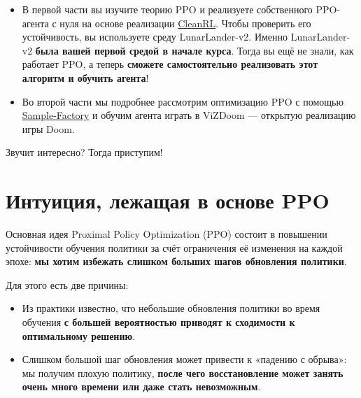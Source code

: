 \documentclass[11pt,a4paper]{article}
\begin{document}
\begin{itemize}
\tightlist
\item
  В первой части вы изучите теорию PPO и реализуете собственного PPO-агента с нуля на основе реализации \href{https://github.com/vwxyzjn/cleanrl}{CleanRL}. Чтобы проверить его устойчивость, вы используете среду LunarLander-v2. Именно LunarLander-v2 \textbf{была вашей первой средой в начале курса}. Тогда вы ещё не знали, как работает PPO, а теперь \textbf{сможете самостоятельно реализовать этот алгоритм и обучить агента}!
\item
  Во второй части мы подробнее рассмотрим оптимизацию PPO с помощью \href{https://samplefactory.dev/}{Sample-Factory} и обучим агента играть в ViZDoom --- открытую реализацию игры Doom.
\end{itemize}


Звучит интересно? Тогда приступим!

\section{Интуиция, лежащая в основе PPO}\label{the-intuition-behind-ppo}

Основная идея Proximal Policy Optimization (PPO) состоит в повышении устойчивости обучения политики за счёт ограничения её изменения на каждой эпохе: \textbf{мы хотим избежать слишком больших шагов обновления политики}.

Для этого есть две причины:

\begin{itemize}
\tightlist
\item
  Из практики известно, что небольшие обновления политики во время обучения \textbf{с большей вероятностью приводят к сходимости к оптимальному решению}.
\item
  Слишком большой шаг обновления может привести к «падению с обрыва»: мы получим плохую политику, \textbf{после чего восстановление может занять очень много времени или даже стать невозможным}.
\end{itemize}

\end{document}
